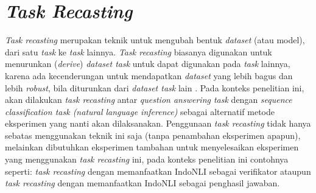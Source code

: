 \section{\emph{Task Recasting}}
\emph{Task recasting} merupakan teknik untuk mengubah bentuk \emph{dataset} (atau model), dari satu \emph{task} ke \emph{task} lainnya. \emph{Task recasting} biasanya digunakan untuk menurunkan (\emph{derive}) \emph{dataset task} untuk dapat digunakan pada \emph{task} lainnya, karena ada kecenderungan untuk mendapatkan \emph{dataset} yang lebih bagus dan lebih \emph{robust}, bila diturunkan dari \emph{dataset task} lain \citep{DBLP:journals/corr/abs-1809-02922}. Pada konteks penelitian ini, akan dilakukan \emph{task recasting} antar \emph{question answering task} dengan \emph{sequence classification task (natural language inference)} sebagai alternatif metode eksperimen yang nanti akan dilaksanakan. Penggunaan \emph{task recasting} tidak hanya sebatas menggunakan teknik ini saja (tanpa penambahan eksperimen apapun), melainkan dibutuhkan eksperimen tambahan untuk menyelesaikan eksperimen yang menggunakan \emph{task recasting} ini, pada konteks penelitian ini contohnya seperti: \emph{task recasting} dengan memanfaatkan IndoNLI sebagai verifikator ataupun \emph{task recasting} dengan memanfaatkan IndoNLI sebagai penghasil jawaban.